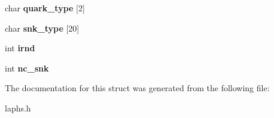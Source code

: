 \begin{DoxyCompactItemize}
\item 
\hypertarget{structcvc_1_1perambulator__type_a9f71585f49b6381204db3602e118d0d1}{char {\bfseries quark\-\_\-type} \mbox{[}2\mbox{]}}\label{structcvc_1_1perambulator__type_a9f71585f49b6381204db3602e118d0d1}

\item 
\hypertarget{structcvc_1_1perambulator__type_aeb6d31a2c6eb4e00ff08d40909eec762}{char {\bfseries snk\-\_\-type} \mbox{[}20\mbox{]}}\label{structcvc_1_1perambulator__type_aeb6d31a2c6eb4e00ff08d40909eec762}

\item 
\hypertarget{structcvc_1_1perambulator__type_ac04013cf0191c6968feeefd6376f5314}{int {\bfseries irnd}}\label{structcvc_1_1perambulator__type_ac04013cf0191c6968feeefd6376f5314}

\item 
\hypertarget{structcvc_1_1perambulator__type_a33fadb9d07f3224473e884212799a0bd}{int {\bfseries nc\-\_\-snk}}\label{structcvc_1_1perambulator__type_a33fadb9d07f3224473e884212799a0bd}

\end{DoxyCompactItemize}


The documentation for this struct was generated from the following file\-:\begin{DoxyCompactItemize}
\item 
laphs.\-h\end{DoxyCompactItemize}
